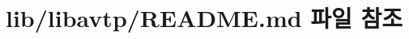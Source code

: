 \hypertarget{lib_2libavtp_2_r_e_a_d_m_e_8md}{}\section{lib/libavtp/\+R\+E\+A\+D\+ME.md 파일 참조}
\label{lib_2libavtp_2_r_e_a_d_m_e_8md}
